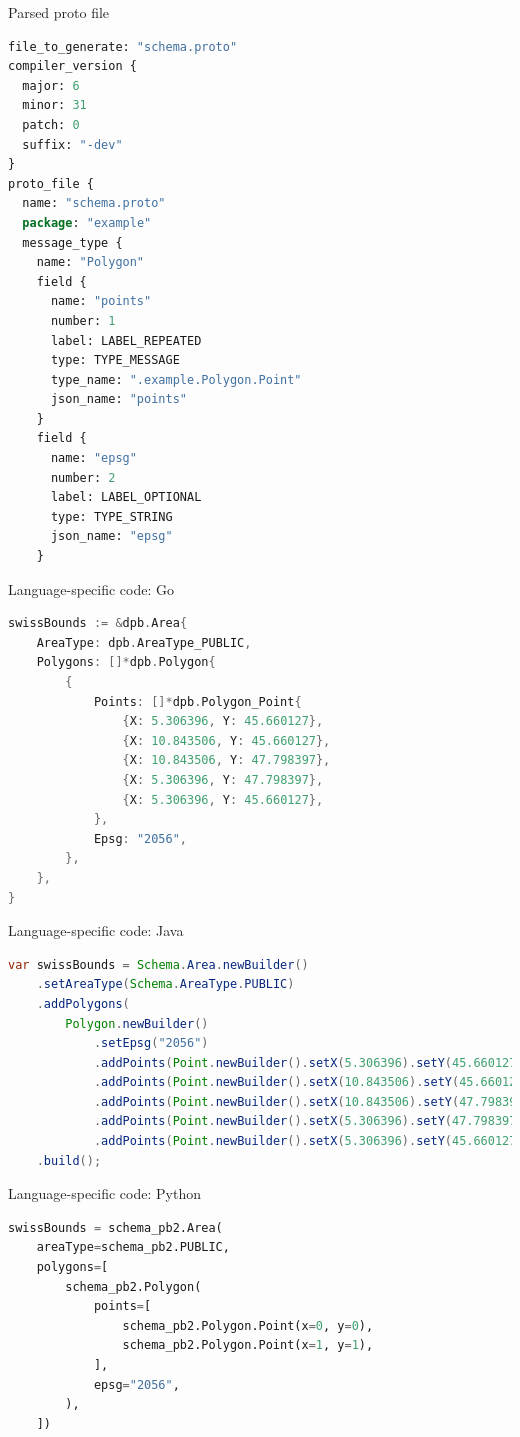 \documentclass{beamer}
\begin{document}
\begin{frame}[fragile]{Parsed proto file}
\begin{lstlisting}[language=protobuf, caption={Parsed protobuf file}]
file_to_generate: "schema.proto"
compiler_version {
  major: 6
  minor: 31
  patch: 0
  suffix: "-dev"
}
proto_file {
  name: "schema.proto"
  package: "example"
  message_type {
    name: "Polygon"
    field {
      name: "points"
      number: 1
      label: LABEL_REPEATED
      type: TYPE_MESSAGE
      type_name: ".example.Polygon.Point"
      json_name: "points"
    }
    field {
      name: "epsg"
      number: 2
      label: LABEL_OPTIONAL
      type: TYPE_STRING
      json_name: "epsg"
    }
\end{lstlisting}
\end{frame}

\begin{frame}[fragile]{Language-specific code: Go}
\begin{lstlisting}[language=go,caption={Create and access proto message in Go}]
swissBounds := &dpb.Area{
    AreaType: dpb.AreaType_PUBLIC,
    Polygons: []*dpb.Polygon{
        {
            Points: []*dpb.Polygon_Point{
                {X: 5.306396, Y: 45.660127},
                {X: 10.843506, Y: 45.660127},
                {X: 10.843506, Y: 47.798397},
                {X: 5.306396, Y: 47.798397},
                {X: 5.306396, Y: 45.660127},
            },
            Epsg: "2056",
        },
    },
}
\end{lstlisting}
\end{frame}

\begin{frame}[fragile]{Language-specific code: Java}
\begin{lstlisting}[language=java,caption={Create and access proto message in Java}]
var swissBounds = Schema.Area.newBuilder()
    .setAreaType(Schema.AreaType.PUBLIC)
    .addPolygons(
        Polygon.newBuilder()
            .setEpsg("2056")
            .addPoints(Point.newBuilder().setX(5.306396).setY(45.660127))
            .addPoints(Point.newBuilder().setX(10.843506).setY(45.660127))
            .addPoints(Point.newBuilder().setX(10.843506).setY(47.798397))
            .addPoints(Point.newBuilder().setX(5.306396).setY(47.798397))
            .addPoints(Point.newBuilder().setX(5.306396).setY(45.660127)))
    .build();
\end{lstlisting}\lstset{style=mystyle}
\end{frame}

\begin{frame}[fragile]{Language-specific code: Python}
\begin{lstlisting}[language=Python,caption={Create and access proto message in Python}]
swissBounds = schema_pb2.Area(
    areaType=schema_pb2.PUBLIC,
    polygons=[
        schema_pb2.Polygon(
            points=[
                schema_pb2.Polygon.Point(x=0, y=0),
                schema_pb2.Polygon.Point(x=1, y=1),
            ],
            epsg="2056",
        ),
    ])
\end{lstlisting}
\end{frame}
\end{document}
